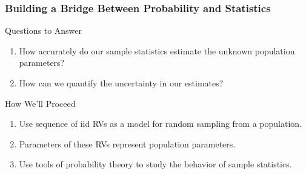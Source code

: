 \documentclass[handout]{beamer}
\begin{document}
\begin{frame}
  \frametitle{Building a Bridge Between Probability and Statistics}
  \begin{block}{Questions to Answer}
  \begin{enumerate}
    \item How accurately do our sample statistics estimate the unknown population parameters?
    \item How can we quantify the uncertainty in our estimates?
  \end{enumerate}
  \end{block}
  \begin{block}{How We'll Proceed}
    \begin{enumerate}
      \item Use sequence of iid RVs as a model for random sampling from a population.
      \item Parameters of these RVs represent population parameters.
      \item Use tools of probability theory to study the behavior of sample statistics. 
    \end{enumerate}
  \end{block}
\end{frame}
\end{document}
